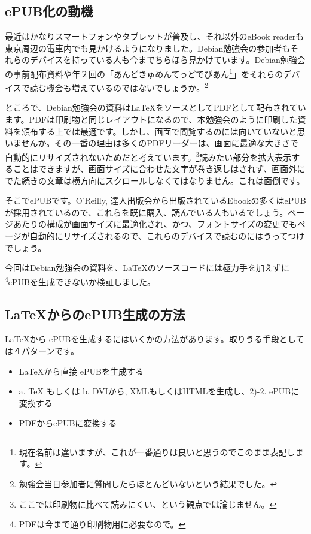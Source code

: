 \documentclass[mingoth,a4paper]{jsarticle}
\begin{document}

\subsection{ePUB化の動機}

最近はかなりスマートフォンやタブレットが普及し、それ以外のeBook readerも東京周辺の電車内でも見かけるようになりました。Debian勉強会の参加者もそれらのデバイスを持っている人も今までちらほら見かけています。Debian勉強会の事前配布資料や年２回の「あんどきゅめんてっどでびあん\footnote{現在名前は違いますが、これが一番通りは良いと思うのでこのまま表記します。}」をそれらのデバイスで読む機会も増えているのではないでしょうか。\footnote{勉強会当日参加者に質問したらほとんどいないという結果でした。}

ところで、Debian勉強会の資料はLaTeXをソースとしてPDFとして配布されています。PDFは印刷物と同じレイアウトになるので、本勉強会のように印刷した資料を頒布する上では最適です。しかし、画面で閲覧するのには向いていないと思いませんか。その一番の理由は多くのPDFリーダーは、画面に最適な大きさで自動的にリサイズされないためだと考えています。\footnote{ここでは印刷物に比べて読みにくい、という観点では論じません。}読みたい部分を拡大表示することはできますが、画面サイズに合わせた文字が巻き返しはされず、画面外にでた続きの文章は横方向にスクロールしなくてはなりません。これは面倒です。

そこでePUBです。O'Reilly, 達人出版会から出版されているEbookの多くはePUBが採用されているので、これらを既に購入、読んでいる人もいるでしょう。ページあたりの構成が画面サイズに最適化され、かつ、フォントサイズの変更でもページが自動的にリサイズされるので、これらのデバイスで読むのにはうってつけでしょう。

今回はDebian勉強会の資料を、LaTeXのソースコードには極力手を加えずに\footnote{PDFは今まで通り印刷物用に必要なので。}ePUBを生成できないか検証しました。

\subsection{LaTeXからのePUB生成の方法}

\LaTeX から ePUBを生成するにはいくかの方法があります。取りうる手段としては４パターンです。

\begin{itemize}
  \item[1)] \LaTeX から直接 ePUBを生成する
  \item[2)] a. TeX もしくは b. DVIから, XMLもしくはHTMLを生成し、2)-2. ePUBに変換する
  \item[3)] PDFからePUBに変換する
\end{itemize}
\end{document}

